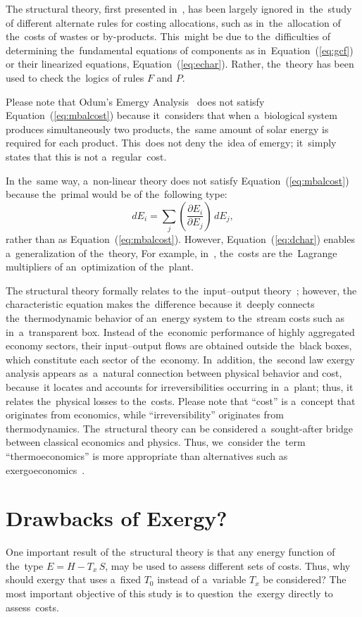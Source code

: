 \documentclass[energies,article,accept,moreauthors,pdftex]{Definitions/mdpi}
\newcommand{\dpartial}[2]{\left(\dfrac{\partial E_{#1}}{\partial E_{#2}}\right)}
\begin{document}
The structural theory, first presented in~\cite{Valero1992a,Valero1993}, has been largely ignored in~the~study of different alternate rules for costing allocations, such as in~the~allocation of the~costs of wastes or by-products. This~might be due to the~difficulties of determining the~fundamental equations of components as in~Equation~(\ref{eq:gcf}) or their linearized equations, Equation~(\ref{eq:echar}). Rather, the~theory has been used to check the~logics of rules $F$ and $P$.

Please note that Odum's Emergy Analysis~\cite{Odum1988,Brown1996} does not satisfy Equation~(\ref{eq:mbalcost}) because it~considers that when a~biological system produces simultaneously two products, the~same amount of solar energy is required for each product. This~does not deny the~idea of emergy; it~simply states that this is not a~regular~cost.

In the~same way, a~non-linear theory does not satisfy Equation~(\ref{eq:mbalcost}) because the~primal would be of the~following type:
\begin{equation}
dE_i=\sum_j \dpartial{i}{j}\, dE_j,
\label{eq:dchar}
\end{equation}
rather than as Equation~(\ref{eq:mbalcost}). However, Equation~(\ref{eq:dchar}) enables a~generalization of the~theory, For example, in~\cite{Valero1993}, the~costs are the~Lagrange multipliers of an~optimization of the~plant.

The structural theory formally relates to the~input–output theory~\cite{Leontief1970}; however, the characteristic equation makes the~difference because it~deeply connects the~thermodynamic behavior of an~energy system to the~stream costs such as in~a~transparent box. Instead of the~economic performance of highly aggregated economy sectors, their input–output flows are obtained outside the~black boxes, which constitute each sector of the~economy. In~addition, the~second law exergy analysis appears as~a~natural connection between physical behavior and cost, because~it locates and accounts for irreversibilities occurring in~a~plant; thus, it relates the~physical losses to the~costs. Please note that “cost” is a~concept that originates from economics, while “irreversibility” originates from thermodynamics. The~structural theory can be considered a~sought-after bridge between classical economics and physics. Thus, we~consider the~term “thermoeconomics” is more appropriate than alternatives such as exergoeconomics~\cite{Tsatsaronis2007}.


\section{Drawbacks of Exergy?}
One important result of the~structural theory is that any energy function of the~type ${E=H-T_x\,S}$, may be used to assess different sets of costs. Thus, why should exergy that uses a~fixed $T_0$ instead of a~variable $T_x$ be considered? The most important objective of this study is to question~the~exergy directly to assess~costs.
\end{document}
